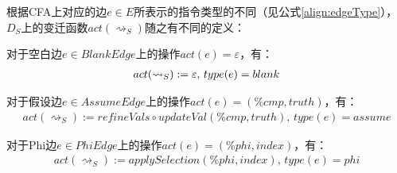 根据CFA上对应的边$ e \in E $所表示的指令类型的不同（见公式\ref{align:edgeType}），$ D_S $上的变迁函数$ act(\rightsquigarrow_S) $随之有不同的定义：

%
%
%

对于空白边$ e \in BlankEdge $上的操作$ act(e) = \varepsilon $，有：
\begin{align}{\label{tr:blankEdge}}
	act(\rightsquigarrow_S) := \varepsilon, \, type(e) = blank
\end{align}

对于假设边$ e \in AssumeEdge $上的操作$ act(e) = (\%cmp, truth) $，有：
\begin{align}
	act(\rightsquigarrow_S) := refineVals \circ updateVal(\%cmp, truth), \, type(e) = assume
\end{align}

对于Phi边$ e \in PhiEdge $上的操作$ act(e) = (\%phi, index) $，有：
\begin{align}
	act(\rightsquigarrow_S) := applySelection(\%phi, index), \, type(e) = phi
\end{align}


